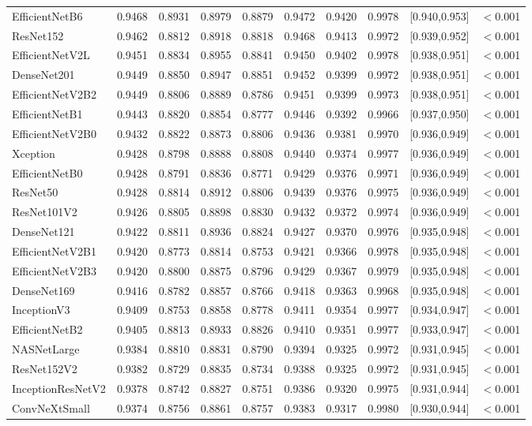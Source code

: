 {\begin{longtable}{L{1.9cm}ccccccccc}
EfficientNetB6&0.9468&0.8931&0.8979&0.8879&0.9472&0.9420&0.9978&[0.940,0.953]&$<$0.001\\
ResNet152&0.9462&0.8812&0.8918&0.8818&0.9468&0.9413&0.9972&[0.939,0.952]&$<$0.001\\
EfficientNetV2L&0.9451&0.8834&0.8955&0.8841&0.9450&0.9402&0.9978&[0.938,0.951]&$<$0.001\\
DenseNet201&0.9449&0.8850&0.8947&0.8851&0.9452&0.9399&0.9972&[0.938,0.951]&$<$0.001\\
EfficientNetV2B2&0.9449&0.8806&0.8889&0.8786&0.9451&0.9399&0.9973&[0.938,0.951]&$<$0.001\\
EfficientNetB1&0.9443&0.8820&0.8854&0.8777&0.9446&0.9392&0.9966&[0.937,0.950]&$<$0.001\\
EfficientNetV2B0&0.9432&0.8822&0.8873&0.8806&0.9436&0.9381&0.9970&[0.936,0.949]&$<$0.001\\
Xception&0.9428&0.8798&0.8888&0.8808&0.9440&0.9374&0.9977&[0.936,0.949]&$<$0.001\\
EfficientNetB0&0.9428&0.8791&0.8836&0.8771&0.9429&0.9376&0.9971&[0.936,0.949]&$<$0.001\\
ResNet50&0.9428&0.8814&0.8912&0.8806&0.9439&0.9376&0.9975&[0.936,0.949]&$<$0.001\\
ResNet101V2&0.9426&0.8805&0.8898&0.8830&0.9432&0.9372&0.9974&[0.936,0.949]&$<$0.001\\
DenseNet121&0.9422&0.8811&0.8936&0.8824&0.9427&0.9370&0.9976&[0.935,0.948]&$<$0.001\\
EfficientNetV2B1&0.9420&0.8773&0.8814&0.8753&0.9421&0.9366&0.9978&[0.935,0.948]&$<$0.001\\
EfficientNetV2B3&0.9420&0.8800&0.8875&0.8796&0.9429&0.9367&0.9979&[0.935,0.948]&$<$0.001\\
DenseNet169&0.9416&0.8782&0.8857&0.8766&0.9418&0.9363&0.9968&[0.935,0.948]&$<$0.001\\
InceptionV3&0.9409&0.8753&0.8858&0.8778&0.9411&0.9354&0.9977&[0.934,0.947]&$<$0.001\\
EfficientNetB2&0.9405&0.8813&0.8933&0.8826&0.9410&0.9351&0.9977&[0.933,0.947]&$<$0.001\\
NASNetLarge&0.9384&0.8810&0.8831&0.8790&0.9394&0.9325&0.9972&[0.931,0.945]&$<$0.001\\
ResNet152V2&0.9382&0.8729&0.8835&0.8734&0.9388&0.9325&0.9972&[0.931,0.945]&$<$0.001\\
InceptionResNetV2&0.9378&0.8742&0.8827&0.8751&0.9386&0.9320&0.9975&[0.931,0.944]&$<$0.001\\
ConvNeXtSmall&0.9374&0.8756&0.8861&0.8757&0.9383&0.9317&0.9980&[0.930,0.944]&$<$0.001\\

\end{longtable}}
